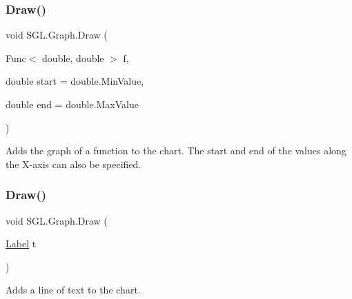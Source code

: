 \mbox{\label{class_s_g_l_1_1_graph_acdd26dba75282796ec6d22b5be177b7e}} 
\subsubsection{\texorpdfstring{Draw()}{Draw()}\hspace{0.1cm}{\footnotesize\ttfamily [1/6]}}
{\footnotesize\ttfamily void S\+G\+L.\+Graph.\+Draw (\begin{DoxyParamCaption}\item[{Func$<$ double, double $>$}]{f,  }\item[{double}]{start = {\ttfamily double.MinValue},  }\item[{double}]{end = {\ttfamily double.MaxValue} }\end{DoxyParamCaption})\hspace{0.3cm}{\ttfamily [inline]}}



Adds the graph of a function to the chart. The start and end of the values along the X-\/axis can also be specified. 

\mbox{\label{class_s_g_l_1_1_graph_a5fa59d087be175868fe52c4b81f4c724}} 
\subsubsection{\texorpdfstring{Draw()}{Draw()}\hspace{0.1cm}{\footnotesize\ttfamily [2/6]}}
{\footnotesize\ttfamily void S\+G\+L.\+Graph.\+Draw (\begin{DoxyParamCaption}\item[{\mbox{\hyperlink{class_s_g_l_1_1_label}{Label}}}]{t }\end{DoxyParamCaption})\hspace{0.3cm}{\ttfamily [inline]}}



Adds a line of text to the chart. 

\mbox{\label{class_s_g_l_1_1_graph_ae4409704a5d6224c6f8a007977922bb8}} 
